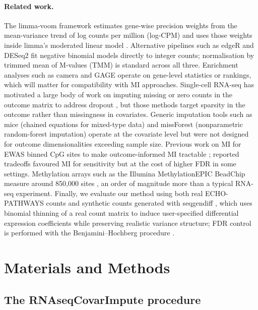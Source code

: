 \documentclass[11pt]{article}
\begin{document}
\paragraph{Related work.} The limma-voom framework estimates gene-wise precision weights from the mean-variance trend of log counts per million (log-CPM) and uses those weights inside limma's moderated linear model \citep{law2014voom,ritchie2015limma}. Alternative pipelines such as edgeR \citep{robinson2010edger} and DESeq2 \citep{love2014deseq2} fit negative binomial models directly to integer counts; normalisation by trimmed mean of M-values (TMM) \citep{robinson2010tmm} is standard across all three. Enrichment analyses such as camera \citep{wu2012camera} and GAGE \citep{luo2009gage} operate on gene-level statistics or rankings, which will matter for compatibility with MI approaches. Single-cell RNA-seq has motivated a large body of work on imputing missing or zero counts in the outcome matrix to address dropout \citep{hao2024scrnaseq}, but those methods target sparsity in the outcome rather than missingness in covariates. Generic imputation tools such as mice (chained equations for mixed-type data) \citep{vanbuuren2011mice} and missForest (nonparametric random-forest imputation) \citep{stekhoven2012missforest} operate at the covariate level but were not designed for outcome dimensionalities exceeding sample size. Previous work on MI for EWAS binned CpG sites to make outcome-informed MI tractable \citep{mill2013epigenomewide,weinhold2020statistical}; reported tradeoffs favoured MI for sensitivity but at the cost of higher FDR in some settings. Methylation arrays such as the Illumina MethylationEPIC BeadChip measure around 850,000 sites \citep{pidsley2016critical}, an order of magnitude more than a typical RNA-seq experiment. Finally, we evaluate our method using both real ECHO-PATHWAYS counts \citep{paulson2022lewinn} and synthetic counts generated with seqgendiff \citep{gerard2020data}, which uses binomial thinning of a real count matrix to induce user-specified differential expression coefficients while preserving realistic variance structure; FDR control is performed with the Benjamini--Hochberg procedure \citep{benjamini1995controlling}.

\section{Materials and Methods}

\subsection{The RNAseqCovarImpute procedure}
\end{document}
